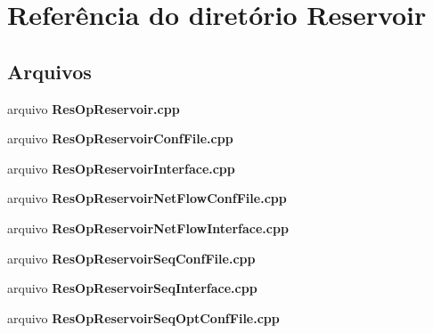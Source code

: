 \section{Referência do diretório Reservoir}
\label{dir_a0ed5479ad6c5d63aff2dff7705337b2}
\subsection*{Arquivos}
\begin{DoxyCompactItemize}
\item 
arquivo {\bf Res\+Op\+Reservoir.\+cpp}
\item 
arquivo {\bf Res\+Op\+Reservoir\+Conf\+File.\+cpp}
\item 
arquivo {\bf Res\+Op\+Reservoir\+Interface.\+cpp}
\item 
arquivo {\bf Res\+Op\+Reservoir\+Net\+Flow\+Conf\+File.\+cpp}
\item 
arquivo {\bf Res\+Op\+Reservoir\+Net\+Flow\+Interface.\+cpp}
\item 
arquivo {\bf Res\+Op\+Reservoir\+Seq\+Conf\+File.\+cpp}
\item 
arquivo {\bf Res\+Op\+Reservoir\+Seq\+Interface.\+cpp}
\item 
arquivo {\bf Res\+Op\+Reservoir\+Seq\+Opt\+Conf\+File.\+cpp}
\end{DoxyCompactItemize}
